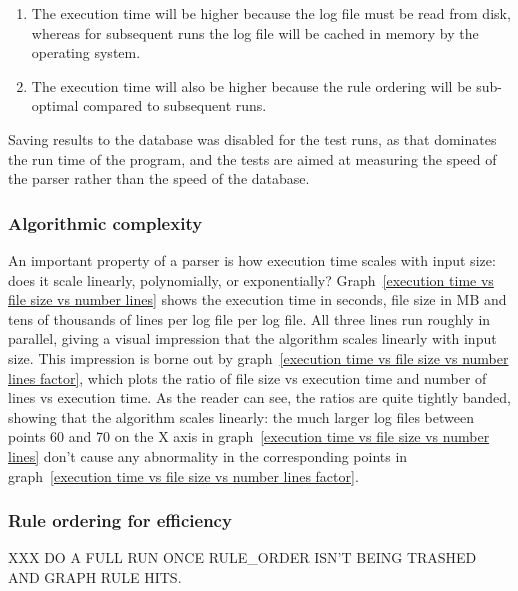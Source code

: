 \documentclass[a4paper,12pt,draft]{article}
\begin{document}
\begin{enumerate}

    \item The execution time will be higher because the log file must be
        read from disk, whereas for subsequent runs the log file will be
        cached in memory by the operating system.

    \item The execution time will also be higher because the rule ordering
        will be sub-optimal compared to subsequent runs.

\end{enumerate}

Saving results to the database was disabled for the test runs, as that
dominates the run time of the program, and the tests are aimed at measuring
the speed of the parser rather than the speed of the database.

\subsubsection{Algorithmic complexity}

An important property of a parser is how execution time scales with input
size: does it scale linearly, polynomially, or exponentially?
Graph~\ref{execution time vs file size vs number lines} shows the execution
time in seconds, file size in MB and tens of thousands of lines per log
file per log file.  All three lines run roughly in parallel, giving a
visual impression that the algorithm scales linearly with input size.  This
impression is borne out by graph~\ref{execution time vs file size vs number
lines factor}, which plots the ratio of file size vs execution time and
number of lines vs execution time.  As the reader can see, the ratios are
quite tightly banded, showing that the algorithm scales linearly: the much
larger log files between points 60 and 70 on the X axis in
graph~\ref{execution time vs file size vs number lines} don't cause any
abnormality in the corresponding points in graph~\ref{execution time vs
file size vs number lines factor}.


\subsubsection{Rule ordering for efficiency}

\label{rule ordering for efficiency}

XXX DO A FULL RUN ONCE RULE\_ORDER ISN'T BEING TRASHED AND GRAPH RULE
HITS\@.
\end{document}

